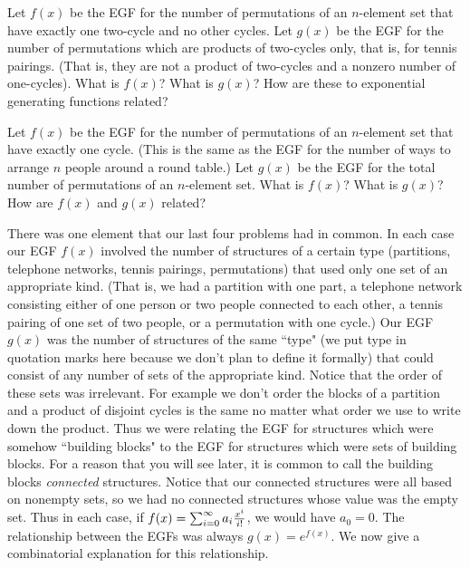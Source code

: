 \itemesi Let $f(x)$ be the EGF for the number of permutations of an
$n$-element set that have exactly one two-cycle and no other cycles. 
Let
$g(x)$ be the EGF for the number of permutations which are products of
two-cycles only, that is, for tennis pairings.  (That is, they are not
a product of two-cycles and a nonzero number of one-cycles).  What is
$f(x)$?  What is
$g(x)$?  How are these to exponential generating functions
related?\label{exp(two-cycle)}

\itemes Let $f(x)$ be the EGF for the number of
permutations of an $n$-element set that have exactly one cycle.  (This is
the same as the EGF for the number of ways to arrange $n$ people around a
round table.)  Let $g(x)$ be the EGF for the total number of permutations
of an $n$-element set.  What is $f(x)$?  What is $g(x)$?  How are $f(x)$
and $g(x)$ related?\label{exp(onecycle)}
\ep

There was one element that our last four problems had in common.  In each
case our EGF $f(x)$ involved the number of structures of
a certain type (partitions, telephone networks, tennis pairings,
permutations) that used only one set of an appropriate kind.  (That is, we
had a partition with one part, a telephone network consisting either of
one person or two people connected to each other, a tennis pairing of one
set of two people, or a permutation with one cycle.)  Our EGF $g(x)$ was
the number of structures of the same ``type" (we put type in quotation
marks here because we don't plan to define it formally) that could consist
of any number of sets of the appropriate kind.  Notice that the order of
these sets was irrelevant.  For example we don't order the blocks of a
partition and a product of disjoint cycles is the same no matter what
order we use to write down the product.  Thus we were relating the EGF for
structures which were somehow ``building blocks" to the EGF for structures
which were sets of building blocks. For a reason that you will see
later, it is common to call the building blocks {\em
connected} structures. Notice that
our connected structures were all based on nonempty sets, so we had no
connected structures whose value was the empty set.  Thus in each case,
if $f(x) = \sum_{i=0}^\infty a_i{x^i\over i!}$, we would have $a_0=0$.
The relationship between the EGFs was always
$g(x) = e^{f(x)}$.  We now give a combinatorial explanation for
this relationship.

